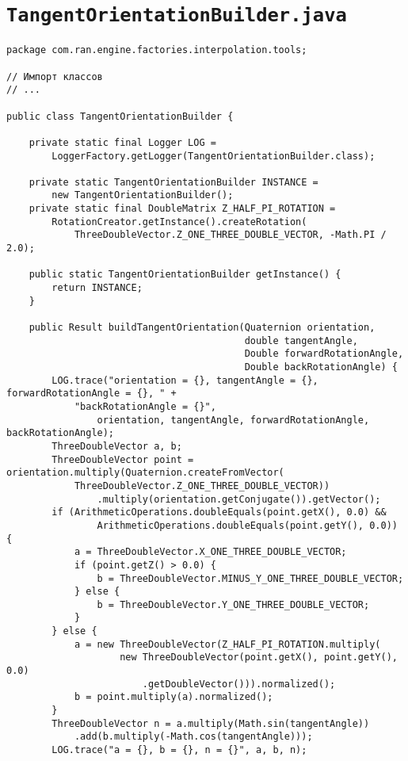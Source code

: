 \section*{\texttt{TangentOrientationBuilder.java}}
\begin{verbatim}
package com.ran.engine.factories.interpolation.tools;

// Импорт классов
// ...

public class TangentOrientationBuilder {

    private static final Logger LOG =
        LoggerFactory.getLogger(TangentOrientationBuilder.class);

    private static TangentOrientationBuilder INSTANCE =
        new TangentOrientationBuilder();
    private static final DoubleMatrix Z_HALF_PI_ROTATION =
        RotationCreator.getInstance().createRotation(
            ThreeDoubleVector.Z_ONE_THREE_DOUBLE_VECTOR, -Math.PI / 2.0);

    public static TangentOrientationBuilder getInstance() {
        return INSTANCE;
    }

    public Result buildTangentOrientation(Quaternion orientation,
                                          double tangentAngle,
                                          Double forwardRotationAngle,
                                          Double backRotationAngle) {
        LOG.trace("orientation = {}, tangentAngle = {}, forwardRotationAngle = {}, " +
            "backRotationAngle = {}",
                orientation, tangentAngle, forwardRotationAngle, backRotationAngle);
        ThreeDoubleVector a, b;
        ThreeDoubleVector point = orientation.multiply(Quaternion.createFromVector(
            ThreeDoubleVector.Z_ONE_THREE_DOUBLE_VECTOR))
                .multiply(orientation.getConjugate()).getVector();
        if (ArithmeticOperations.doubleEquals(point.getX(), 0.0) &&
                ArithmeticOperations.doubleEquals(point.getY(), 0.0)) {
            a = ThreeDoubleVector.X_ONE_THREE_DOUBLE_VECTOR;
            if (point.getZ() > 0.0) {
                b = ThreeDoubleVector.MINUS_Y_ONE_THREE_DOUBLE_VECTOR;
            } else {
                b = ThreeDoubleVector.Y_ONE_THREE_DOUBLE_VECTOR;
            }
        } else {
            a = new ThreeDoubleVector(Z_HALF_PI_ROTATION.multiply(
                    new ThreeDoubleVector(point.getX(), point.getY(), 0.0)
                        .getDoubleVector())).normalized();
            b = point.multiply(a).normalized();
        }
        ThreeDoubleVector n = a.multiply(Math.sin(tangentAngle))
            .add(b.multiply(-Math.cos(tangentAngle)));
        LOG.trace("a = {}, b = {}, n = {}", a, b, n);


\end{verbatim}
